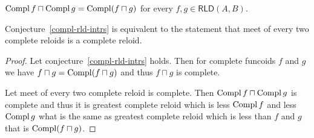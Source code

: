 \begin{conjecture}\label{compl-rld-intrs}
$\operatorname{Compl} f\sqcap\operatorname{Compl} g=\operatorname{Compl}(f\sqcap g)$ for every $f,g\in\mathsf{RLD}(A,B)$.\end{conjecture}

\begin{prop}
Conjecture~\ref{compl-rld-intrs} is equivalent to the statement that meet of every two complete reloids is a complete reloid.
\end{prop}

\begin{proof}
Let conjecture~\ref{compl-rld-intrs} holds. Then for complete funcoids $f$ and $g$ we have $f \sqcap g =
\operatorname{Compl} (f \sqcap g)$ and thus $f \sqcap g$ is complete.

Let meet of every two complete reloid is complete. Then $\operatorname{Compl} f \sqcap
\operatorname{Compl} g$ is complete and thus it is greatest complete reloid which is
less $\operatorname{Compl} f$ and less $\operatorname{Compl} g$ what is the same as greatest
complete reloid which is less than $f$ and $g$ that is $\operatorname{Compl} (f \sqcap
g)$.
\end{proof}


